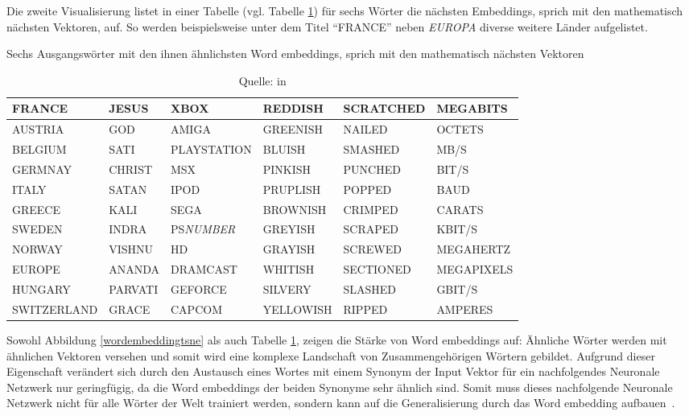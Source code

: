 \documentclass{hwz}
\begin{document}
Die zweite Visualisierung listet in einer Tabelle (vgl. Tabelle \ref{wordembeddingtable}) für sechs Wörter die nächsten Embeddings, sprich mit den mathematisch nächsten Vektoren, auf. So werden beispielsweise unter dem Titel \enquote{FRANCE} neben \textit{EUROPA} diverse weitere Länder aufgelistet.
\begin{table}[h]
\centering
    \caption{Sechs Ausgangswörter mit den ihnen ähnlichsten Word embeddings, sprich mit den mathematisch nächsten Vektoren}
    \label{wordembeddingtable}
    \renewcommand{\arraystretch}{1.25}
    \setlength{\tabcolsep}{3pt}
    \small
    \begin{tabular}{ | l | l | l | l | l | l |}
    \hline
    \rowcolor{ccc} FRANCE & JESUS & XBOX & REDDISH & SCRATCHED & MEGABITS \\ \hline
    AUSTRIA & GOD & AMIGA & GREENISH & NAILED & OCTETS \\ \hline
    BELGIUM & SATI & PLAYSTATION & BLUISH & SMASHED & MB/S \\ \hline
    GERMNAY& CHRIST & MSX & PINKISH & PUNCHED & BIT/S \\ \hline
    ITALY & SATAN & IPOD & PRUPLISH & POPPED & BAUD \\ \hline
    GREECE & KALI & SEGA & BROWNISH & CRIMPED & CARATS \\ \hline
    SWEDEN & INDRA & PS\textit{NUMBER} & GREYISH & SCRAPED & KBIT/S \\ \hline
    NORWAY & VISHNU & HD & GRAYISH & SCREWED & MEGAHERTZ \\ \hline
    EUROPE & ANANDA & DRAMCAST & WHITISH & SECTIONED & MEGAPIXELS \\ \hline
    HUNGARY & PARVATI & GEFORCE & SILVERY & SLASHED & GBIT/S \\ \hline
    SWITZERLAND & GRACE & CAPCOM & YELLOWISH & RIPPED & AMPERES \\ \hline
    \end{tabular}
    \caption*{Quelle: \textcite{Collobert2011NaturalScratch} in \textcite{Olah2014DeepRepresentations}}
\end{table}

Sowohl Abbildung \ref{wordembeddingtsne} als auch Tabelle \ref{wordembeddingtable}, zeigen die Stärke von Word embeddings auf: Ähnliche Wörter werden mit ähnlichen Vektoren versehen und somit wird eine komplexe Landschaft von Zusammengehörigen Wörtern gebildet. Aufgrund dieser Eigenschaft verändert sich durch den Austausch eines Wortes mit einem Synonym der Input Vektor für ein nachfolgendes Neuronale Netzwerk nur geringfügig, da die Word embeddings der beiden Synonyme sehr ähnlich sind. Somit muss dieses nachfolgende Neuronale Netzwerk nicht für alle Wörter der Welt trainiert werden, sondern kann auf die Generalisierung durch das Word embedding aufbauen~\autocite{Olah2014DeepRepresentations}.
\end{document}
